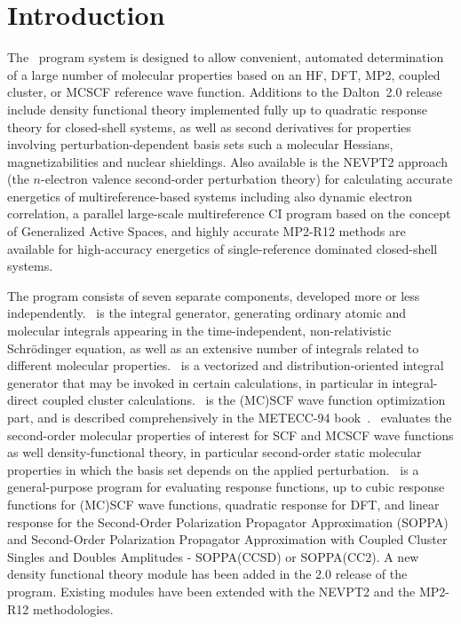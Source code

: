 \chapter{Introduction}\label{ch:intro}

The \dalton\ program system is designed to allow convenient,
automated determination of a large number of molecular properties
based on an HF, DFT, MP2, coupled cluster, or MCSCF reference wave
function. Additions to the Dalton~2.0 release include
density functional theory implemented fully up to quadratic response
theory for closed-shell systems, as well as second derivatives for
properties involving perturbation-dependent basis sets such a
molecular Hessians, magnetizabilities and nuclear shieldings. Also
available is the NEVPT2 approach
(the $n$-electron valence second-order perturbation theory) for
calculating  accurate energetics of
multireference-based systems including also dynamic electron
correlation, a parallel large-scale multireference CI program based on the concept of
Generalized Active Spaces, and highly accurate MP2-R12
 methods are available for high-accuracy energetics of
single-reference dominated closed-shell systems.

 The program consists
of seven separate components, developed more or less independently.
\her\ is the integral generator, generating ordinary
atomic and molecular integrals appearing in the
time-independent, non-relativistic Schr\"{o}dinger equation, as well as
an extensive number of integrals related to different molecular
properties. \eri\ is a vectorized and distribution-oriented integral
generator that may be invoked in certain calculations, in particular in
integral-direct coupled cluster calculations. \sir\ is the (MC)SCF wave
function optimization part, and is described comprehensively in the
METECC-94 book~\cite{hjajhajomotecc}. \aba\ evaluates the second-order
molecular properties of interest for SCF and MCSCF wave functions as
well density-functional theory, in particular second-order static
molecular properties in which the basis set depends on the applied
perturbation. \resp\ is a general-purpose program for evaluating
response functions, up to cubic response functions for (MC)SCF wave
functions, quadratic response for DFT, and linear response for the
Second-Order Polarization Propagator Approximation (SOPPA) and
Second-Order Polarization Propagator Approximation with Coupled Cluster
Singles and Doubles Amplitudes - SOPPA(CCSD) or SOPPA(CC2). A new
density functional theory module has been added in the 2.0 release of
the program. Existing modules have been extended with the NEVPT2 and
the MP2-R12 methodologies.

